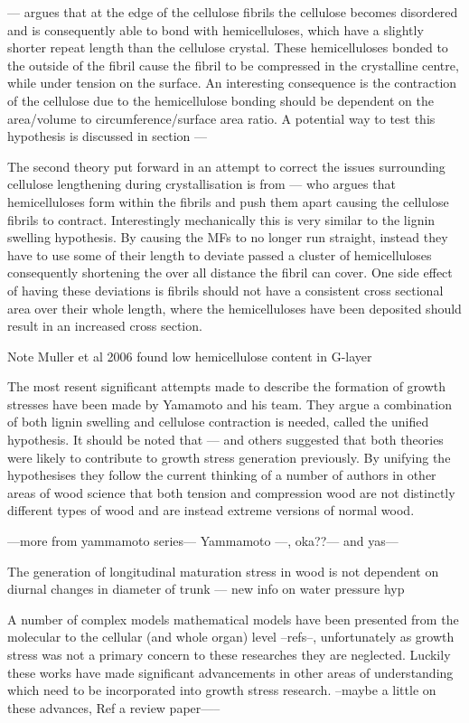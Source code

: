 \documentclass{article}
\begin{document}
--- argues that at the edge of the cellulose fibrils the cellulose becomes
disordered and is consequently able to bond with hemicelluloses, which have a
slightly shorter repeat length than the cellulose crystal. These hemicelluloses
bonded to the outside of the fibril cause the fibril to be compressed in the
crystalline centre, while under tension on the surface. An interesting consequence
is the contraction of the cellulose due to the hemicellulose bonding should be
dependent on the area/volume to circumference/surface area ratio. A potential way
to test this hypothesis is discussed in section ---

The second theory put forward in an attempt to correct the issues surrounding
cellulose lengthening during crystallisation is from --- who argues that
hemicelluloses form within the fibrils and push them apart causing the
cellulose fibrils to contract. Interestingly mechanically this is very similar
to the lignin swelling hypothesis. By causing the MFs to no longer run straight,
instead they have to use some of their length to deviate passed a cluster of
hemicelluloses consequently shortening the over all distance the fibril can
cover. One side effect of having these deviations is fibrils should not have a
consistent cross sectional area over their whole length, where the
hemicelluloses have been deposited should result in an increased cross section.

Note Muller et al 2006 found low hemicellulose content in G-layer

The most resent significant attempts made to describe the formation of growth
stresses have been made by Yamamoto and his team. They argue a combination of both lignin
swelling and cellulose contraction is needed, called the unified hypothesis. It
should be noted that --- and others suggested that both theories were likely to
contribute to growth stress generation previously. By unifying the hypothesises
they follow the current thinking of a number of authors in other areas of wood science that
both tension and compression wood are not distinctly different types of wood and
are instead extreme versions of normal wood.

---more from yammamoto series---
Yammamoto ---, oka??--- and yas---

The generation of longitudinal maturation stress in wood is not dependent on
diurnal changes in diameter of trunk --- new info on water pressure hyp

A number of complex models mathematical models have been presented from the
molecular to the cellular (and whole organ) level --refs--, unfortunately as
growth stress was not a primary concern to these researches they are neglected.
Luckily these works have made significant advancements in other areas of
understanding which need to be incorporated into growth stress research. --maybe
a little on these advances, Ref a review paper-----
\end{document}
